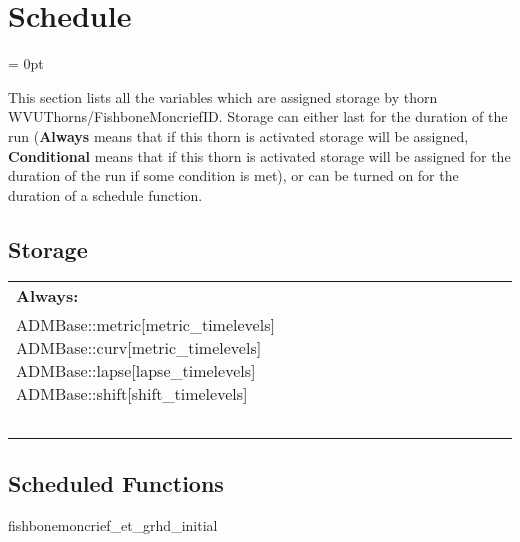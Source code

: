
\section{Schedule} 


\parskip = 0pt


\noindent This section lists all the variables which are assigned storage by thorn WVUThorns/FishboneMoncriefID.  Storage can either last for the duration of the run ({\bf Always} means that if this thorn is activated storage will be assigned, {\bf Conditional} means that if this thorn is activated storage will be assigned for the duration of the run if some condition is met), or can be turned on for the duration of a schedule function.


\subsection*{Storage}

\hspace{5mm}

 \begin{tabular*}{160mm}{ll} 

{\bf Always:}&  ~ \\ 
 ADMBase::metric[metric\_timelevels] ADMBase::curv[metric\_timelevels] ADMBase::lapse[lapse\_timelevels] ADMBase::shift[shift\_timelevels] & ~\\ 
~ & ~\\ 
\end{tabular*} 


\subsection*{Scheduled Functions}
\vspace{5mm}


\hspace{5mm} fishbonemoncrief\_et\_grhd\_initial 

\hspace{5mm}{\it set up general relativistic hydrodynamic (grhd) fields for fishbone-moncrief disk } 


\hspace{5mm}

